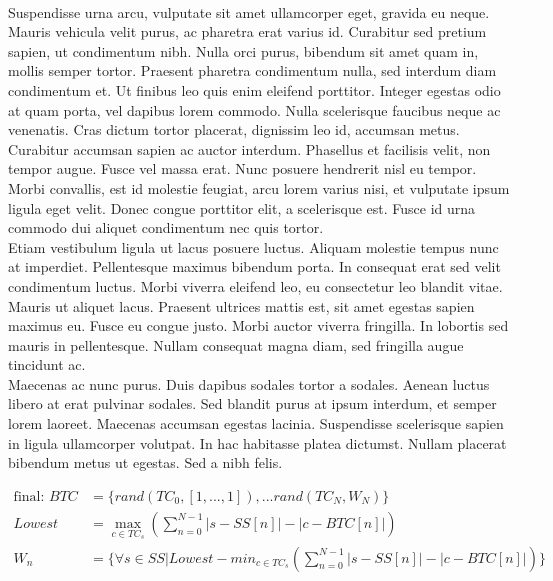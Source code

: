 \documentclass[paper=a4,dissertation,math,vertlayout,pdfa,colorlinks,nologo]{aaltoseries}
\newcommand\tab[1][1cm]{\hspace*{#1}}
\begin{document}
\\ \tab Suspendisse urna arcu, vulputate sit amet ullamcorper eget, gravida eu neque. Mauris vehicula velit purus, ac pharetra erat varius id. Curabitur sed pretium sapien, ut condimentum nibh. Nulla orci purus, bibendum sit amet quam in, mollis semper tortor. Praesent pharetra condimentum nulla, sed interdum diam condimentum et. Ut finibus leo quis enim eleifend porttitor. Integer egestas odio at quam porta, vel dapibus lorem commodo. Nulla scelerisque faucibus neque ac venenatis. Cras dictum tortor placerat, dignissim leo id, accumsan metus. Curabitur accumsan sapien ac auctor interdum. Phasellus et facilisis velit, non tempor augue. Fusce vel massa erat. Nunc posuere hendrerit nisl eu tempor. Morbi convallis, est id molestie feugiat, arcu lorem varius nisi, et vulputate ipsum ligula eget velit. Donec congue porttitor elit, a scelerisque est. Fusce id urna commodo dui aliquet condimentum nec quis tortor.
\\ \tab Etiam vestibulum ligula ut lacus posuere luctus. Aliquam molestie tempus nunc at imperdiet. Pellentesque maximus bibendum porta. In consequat erat sed velit condimentum luctus. Morbi viverra eleifend leo, eu consectetur leo blandit vitae. Mauris ut aliquet lacus. Praesent ultrices mattis est, sit amet egestas sapien maximus eu. Fusce eu congue justo. Morbi auctor viverra fringilla. In lobortis sed mauris in pellentesque. Nullam consequat magna diam, sed fringilla augue tincidunt ac.
\\ \tab Maecenas ac nunc purus. Duis dapibus sodales tortor a sodales. Aenean luctus libero at erat pulvinar sodales. Sed blandit purus at ipsum interdum, et semper lorem laoreet. Maecenas accumsan egestas lacinia. Suspendisse scelerisque sapien in ligula ullamcorper volutpat. In hac habitasse platea dictumst. Nullam placerat bibendum metus ut egestas. Sed a nibh felis.\cite{lipsum}

\begin{align}
    \text{final: } BTC &= \{ rand(TC_0, [1, ..., 1]), ... rand(TC_N, W_N) \} \nonumber \\
    Lowest &= \max_{c \in TC_s}(\sum_{n=0}^{N - 1}|s - SS[n]| - |c - BTC[n]|) \nonumber \\
    W_n &= \{ \forall s \in SS| Lowest - min_{c \in TC_s}(\sum_{n=0}^{N - 1}|s - SS[n]| - |c - BTC[n]|)\}
\end{align}

\end{document}
